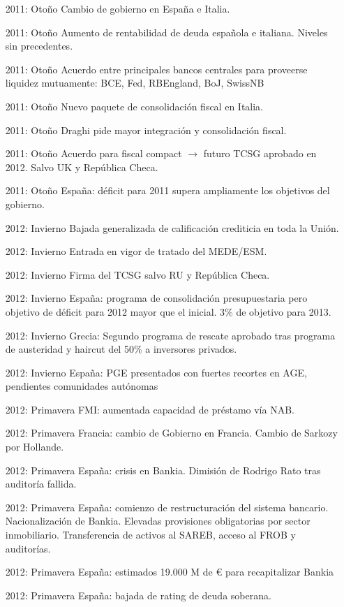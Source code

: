 \documentclass{nuevotema}
\begin{document}
\begin{itemize}
	\item[2011: Otoño] Cambio de gobierno en España e Italia.
	\item[2011: Otoño] Aumento de rentabilidad de deuda española e italiana. Niveles sin precedentes.
	\item[2011: Otoño] Acuerdo entre principales bancos centrales para proveerse liquidez mutuamente: BCE, Fed, RBEngland, BoJ, SwissNB
	\item[2011: Otoño] Nuevo paquete de consolidación fiscal en Italia.
	\item[2011: Otoño] Draghi pide mayor integración y consolidación fiscal.
	\item[2011: Otoño] Acuerdo para fiscal compact $\to$ futuro TCSG aprobado en 2012. Salvo UK y República Checa.
	\item[2011: Otoño] España: déficit para 2011 supera ampliamente los objetivos del gobierno.
	\item[2012: Invierno] Bajada generalizada de calificación crediticia en toda la Unión.
	\item[2012: Invierno] Entrada en vigor de tratado del MEDE/ESM.
	\item[2012: Invierno] Firma del TCSG salvo RU y República Checa. 
	\item[2012: Invierno] España: programa de consolidación presupuestaria pero objetivo de déficit para 2012 mayor que el inicial. 3\% de objetivo para 2013.
	\item[2012: Invierno] Grecia: Segundo programa de rescate aprobado tras programa de austeridad y haircut del 50\% a inversores privados.
	\item[2012: Invierno] España: PGE presentados con fuertes recortes en AGE, pendientes comunidades autónomas
	\item[2012: Primavera] FMI: aumentada capacidad de préstamo vía NAB.
	\item[2012: Primavera] Francia: cambio de Gobierno en Francia. Cambio de Sarkozy por Hollande.
	\item[2012: Primavera] España: crisis en Bankia. Dimisión de Rodrigo Rato tras auditoría fallida.
	\item[2012: Primavera] España: comienzo de restructuración del sistema bancario. Nacionalización de Bankia. Elevadas provisiones obligatorias por sector inmobiliario. Transferencia de activos al SAREB, acceso al FROB y auditorías.
	\item[2012: Primavera] España: estimados 19.000 M de € para recapitalizar Bankia
	\item[2012: Primavera] España: bajada de rating de deuda soberana.

\end{itemize}
\end{document}

